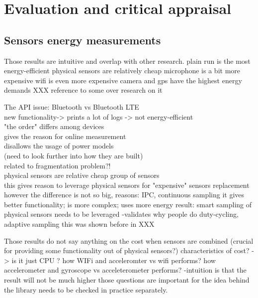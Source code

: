 \section{Evaluation and critical appraisal}
\label{s:evaluation}

\subsection{Sensors energy measurements}




Those results are intuitive and overlap with other research.
	plain run is the most energy-efficient
	physical sensors are relatively cheap
	microphone is a bit more expensive 
	wifi is even more expensive
	camera and gps have the highest energy demands
	XXX reference to some over research on it
	

The API issue: Bluetooth vs Bluetooth LTE\\
	new functionality-> prints a lot of logs -> not energy-efficient\\				
				
"the order" differs among devices\\
	gives the reason for online measurement\\
	disallows the usage of power models\\
		(need to look further into how they are built)\\
		related to fragmentation problem?!\\

physical sensors are relative cheap group of sensors \\
	this gives reason to leverage physical sensors for "expensive" sensors replacement
	however the difference is not so big,
		reasons: IPC, continuous sampling
			it gives better functionality; is more complex; uses more energy
		result: smart sampling of physical sensors needs to be leveraged
			-validates why people do duty-cycling, adaptive sampling
		this was shown before in XXX
			
			
Those results do not say anything on the cost when sensors are combined
		(crucial for providing some functionality out of physical sensors?)
		characteristics of cost? -> is it just CPU ?
			how WIFi and acceleromter vs wifi performs?
			how accelerometer and gyroscope vs acceleterometer performs?
				-intuition is that the result will not be much higher
			those questions are important for the idea behind  the library
				needs to be checked in practice separately.
		
